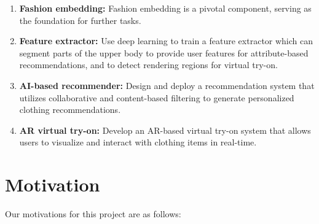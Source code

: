 	\begin{enumerate}
		\item \textbf{Fashion embedding:} Fashion embedding is a pivotal component, serving as the foundation for further tasks.
		\item \textbf{Feature extractor:} Use deep learning to train a feature extractor which can segment parts of the upper body to provide user features for attribute-based recommendations, and to detect rendering regions for virtual try-on.
		\item \textbf{AI-based recommender:} Design and deploy a recommendation system that utilizes collaborative and content-based filtering to generate personalized clothing recommendations.
		\item \textbf{AR virtual try-on:} Develop an AR-based virtual try-on system that allows users to visualize and interact with clothing items in real-time.
	\end{enumerate}

\section{Motivation}
	Our motivations for this project are as follows:

